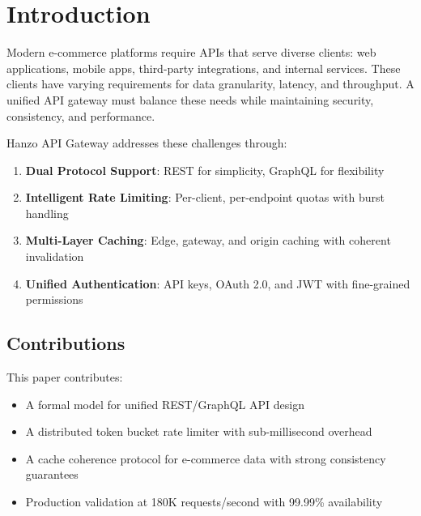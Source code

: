 \section{Introduction}


Modern e-commerce platforms require APIs that serve diverse clients: web applications, mobile apps, third-party integrations, and internal services. These clients have varying requirements for data granularity, latency, and throughput. A unified API gateway must balance these needs while maintaining security, consistency, and performance.

Hanzo API Gateway addresses these challenges through:

\begin{enumerate}
    \item \textbf{Dual Protocol Support}: REST for simplicity, GraphQL for flexibility
    \item \textbf{Intelligent Rate Limiting}: Per-client, per-endpoint quotas with burst handling
    \item \textbf{Multi-Layer Caching}: Edge, gateway, and origin caching with coherent invalidation
    \item \textbf{Unified Authentication}: API keys, OAuth 2.0, and JWT with fine-grained permissions
\end{enumerate}

\subsection{Contributions}

This paper contributes:

\begin{itemize}
    \item A formal model for unified REST/GraphQL API design
    \item A distributed token bucket rate limiter with sub-millisecond overhead
    \item A cache coherence protocol for e-commerce data with strong consistency guarantees
    \item Production validation at 180K requests/second with 99.99\% availability
\end{itemize}

